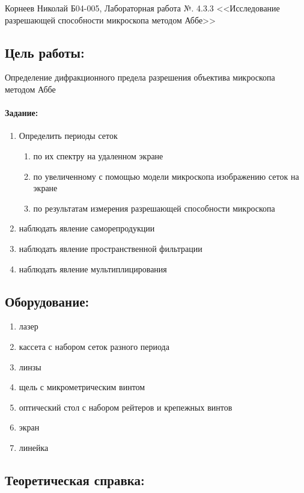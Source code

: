 \documentclass[a4paper,12pt]{article}
\author{Бичина Марина 
группа Б04-005 2 курса ФЭФМ}
\title{}
\date{}
\begin{document}

\begin{center}
\begin{Large}
{Корнеев Николай Б04-005, Лабораторная работа №. 4.3.3 <<Исследование разрешающей способности микроскопа методом Аббе>>}
\end{Large}
\end{center}
\subsection*{Цель работы:} 
Определение дифракционного предела разрешения объектива микроскопа методом Аббе
\paragraph{Задание:} 
\begin{enumerate}
\itemsep0em
\item Определить периоды сеток
\begin{enumerate}
\itemsep0em
\item по их спектру на удаленном экране
\item по увеличенному с помощью модели микроскопа изображению сеток на экране
\item по результатам измерения разрешающей способности микроскопа
\end{enumerate}
\item наблюдать явление саморепродукции
\item наблюдать явление пространственной фильтрации 
\item наблюдать явление мультиплицирования
\end{enumerate}
\subsection*{Оборудование:}
\begin{enumerate}
\itemsep0em
\item лазер
\item кассета с набором сеток разного периода
\item линзы
\item щель с микрометрическим винтом
\item оптический стол с набором рейтеров и крепежных винтов
\item экран
\item линейка
\end{enumerate}
\subsection*{Теоретическая справка:}
\end{document}
